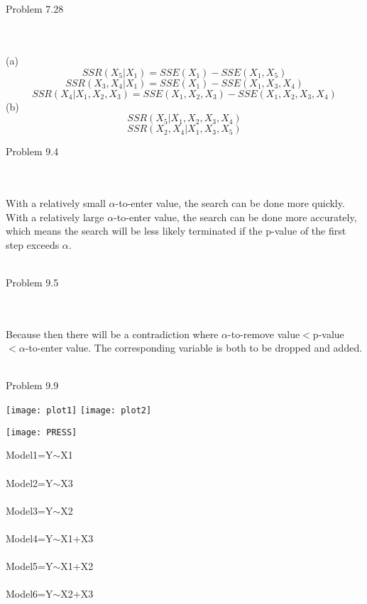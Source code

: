\documentclass{article}
\begin{document}
   \\\\\begin{large}Problem 7.28\end{large}
   \\\\(a)\[SSR(X_5|X_1)=SSE(X_1)-SSE(X_1,X_5)\]
   \[SSR(X_3,X_4|X_1)=SSE(X_1)-SSE(X_1,X_3,X_4)\]
      \[SSR(X_4|X_1,X_2,X_3)=SSE(X_1,X_2,X_3)-SSE(X_1,X_2,X_3,X_4)\]
   (b)\[SSR(X_5|X_1,X_2,X_3,X_4)\]
   \[SSR(X_2,X_4|X_1,X_3,X_5)\]
   \begin{large}Problem 9.4\end{large}
   \\\\With a relatively small $\alpha$-to-enter value, the search can be done more quickly. With a relatively large $\alpha$-to-enter value, the search can be done more accurately, which means the search will be less likely terminated if the p-value of the first step exceeds $\alpha$.
  \\\\ \begin{large}Problem 9.5\end{large}
   \\\\Because then there will be a contradiction where $\alpha$-to-remove value$<$p-value$<\alpha$-to-enter value. The corresponding variable is both to be dropped and added.
 \\\\     \begin{large}Problem 9.9\end{large}
   \begin{center}\texttt{[image: plot1]}
 \texttt{[image: plot2]}\end{center}
   \begin{center}\texttt{[image: PRESS]}\end{center}
   Model1=Y$\sim$X1\\\\
   Model2=Y$\sim$X3\\\\
   Model3=Y$\sim$X2\\\\
   Model4=Y$\sim$X1+X3\\\\
   Model5=Y$\sim$X1+X2\\\\
   Model6=Y$\sim$X2+X3\\\\
\end{document}
